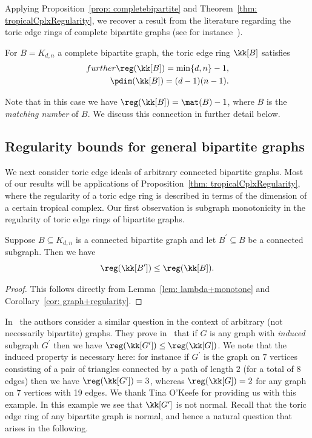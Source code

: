 Applying Proposition~\ref{prop: completebipartite} and Theorem~\ref{thm: tropicalCplxRegularity}, we recover a result from the literature regarding the toric edge rings of complete bipartite graphs (see for instance~\cite[Lemma 3.10]{ha2019}).
\begin{cor}
For $B = K_{d,n}$ a complete bipartite graph, the toric edge ring $\kk[B]$ satisfies
\begin{equation*}
\begin{split}further
\reg (\kk[B]) = \min\{d,n\} - 1, \\
\pdim (\kk[B]) = (d-1)(n-1).
\end{split}
\end{equation*}
\end{cor}

Note that in this case we have $\reg(\kk[B]) = \mat(B) - 1$, where $B$ is the \emph{matching number} of $B$. 
We discuss this connection in further detail below.


\subsection{Regularity bounds for general bipartite graphs}

We next consider toric edge ideals of arbitrary connected bipartite graphs.  Most of our results will be applications of Proposition~\ref{thm: tropicalCplxRegularity}, where the regularity of a toric edge ring is described in terms of the dimension of a certain tropical complex. Our first observation is subgraph monotonicity in the regularity of toric edge rings of bipartite graphs.

\begin{theorem}\label{thm: subgraph}
Suppose $B \subseteq K_{d,n}$ is a connected bipartite graph and let $B^\prime \subseteq B$ be a connected subgraph.  Then we have
\[\reg(\kk[B^\prime]) \leq \reg(\kk[B]).\]
\end{theorem}

\begin{proof}
This follows directly from Lemma~\ref{lem: lambda+monotone} and Corollary~\ref{cor: graph+regularity}.
\end{proof}

In~\cite{ha2019} the authors consider a similar question in the context of arbitrary (not necessarily bipartite) graphs.  They prove in~\cite[Theorem 3.7]{ha2019} that if $G$ is any graph with \emph{induced} subgraph $G^\prime$ then we have $\reg(\kk[G^\prime]) \leq \reg(\kk[G])$. We note that the induced property is necessary here: for instance if $G^\prime$ is the graph on $7$ vertices consisting of a pair of triangles connected by a path of length $2$ (for a total of 8 edges) then we have $\reg(\kk[G^\prime]) = 3$, whereas $\reg(\kk[G]) = 2$ for any graph on $7$ vertices with 19 edges.  We thank Tina O'Keefe for providing us with this example. In this example we see that $\kk[G^\prime]$ is not normal. Recall that the toric edge ring of any bipartite graph is normal, and hence a natural question that arises in the following.


